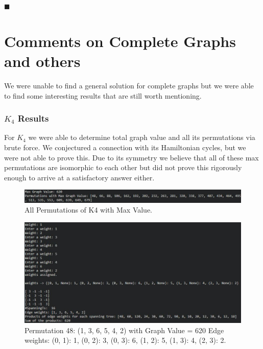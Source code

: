 \documentclass[12pt,letterpaper]{article}
\begin{document}
$\blacksquare$\\

\part{Comments on Complete Graphs and others} \label{Kn}

We were unable to find a general solution for complete graphs but we were able to find some interesting results that are still worth mentioning.

\section{$K_{4}$ Results}

For $K_{4}$ we were able to determine total graph value and all its permutations via brute force. We conjectured a connection with its Hamiltonian cycles, but we were not able to prove this. Due to its symmetry we believe that all of these max permutations are isomorphic to each other but did not prove this rigorously enough to arrive at a satisfactory answer either.

\begin{figure}[hbt!]  
    \begin{center}
    \includegraphics[width=6in]{f4.1.jpg}
    \caption{\label{last} All Permutations of K4 with Max Value.}
    \end{center}
	\end{figure}
\begin{figure}[hbt!]  
    \begin{center}
    \includegraphics[width=6in]{f4.11}
    \caption{\label{last} Permutation 48: (1, 3, 6, 5, 4, 2) with Graph Value = 620
Edge weights: {(0, 1): 1, (0, 2): 3, (0, 3): 6, (1, 2): 5, (1, 3): 4, (2, 3): 2}.}
    \end{center}
	\end{figure}
\end{document}
